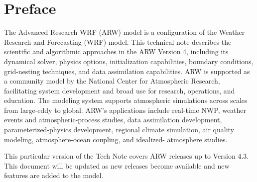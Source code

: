 \chapter*{Preface}

\hskip 20pt 
\noindent

The Advanced Research WRF (ARW) model is a configuration of the Weather Research and Forecasting (WRF) model.  
This technical note describes the scientific and algorithmic approaches in the ARW Version 4, including 
its dynamical solver, physics options, initialization capabilities, boundary conditions, grid-nesting 
techniques, and data assimilation capabilities.  ARW is supported as a community model by the National 
Center for Atmospheric Research, facilitating system development and broad use for research, operations, 
and education. The modeling system supports atmospheric simulations across scales from large-eddy to 
global. ARW’s applications include real-time NWP, weather events and atmospheric-process studies, 
data assimilation development, parameterized-physics development, regional climate simulation, 
air quality modeling, atmosphere-ocean coupling, and idealized- atmosphere studies.

\vskip 10pt
This particular version of the Tech Note covers ARW releases up to Version 4.3.
This document will be updated as new releases become available and new features are added to the model.

